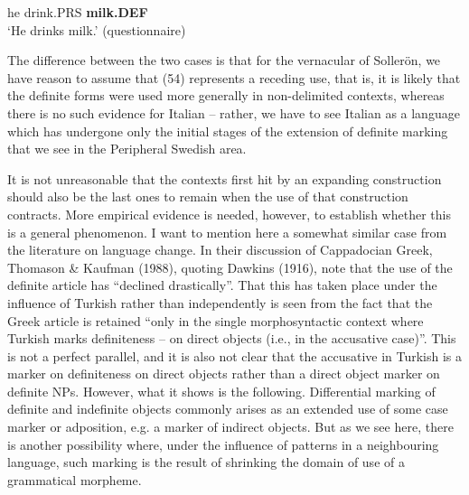 he  drink.PRS  \textbf{milk.DEF}\\


‘He drinks milk.’ (questionnaire)
\z


The difference between the two cases is that for the vernacular of Sollerön, we have reason to assume that (54) represents a receding use, that is, it is likely that the definite forms were used more generally in non-delimited contexts, whereas there is no such evidence for Italian – rather, we have to see Italian as a language which has undergone only the initial stages of the extension of definite marking that we see in the Peripheral Swedish area. 

It is not unreasonable that the contexts first hit by an expanding construction should also be the last ones to remain when the use of that construction contracts. More empirical evidence is needed, however, to establish whether this is a general phenomenon. I want to mention here a somewhat similar case from the literature on language change. In their discussion of Cappadocian Greek, Thomason \& Kaufman (1988), quoting Dawkins (1916), note that the use of the definite article has “declined drastically”. That this has taken place under the influence of Turkish rather than independently is seen from the fact that the Greek article is retained “only in the single morphosyntactic context where Turkish marks definiteness – on direct objects (i.e., in the accusative case)”. This is not a perfect parallel, and it is also not clear that the accusative in Turkish is a marker on definiteness on direct objects rather than a direct object marker on definite NPs. However, what it shows is the following. Differential marking of definite and indefinite objects commonly arises as an extended use of some case marker or adposition, e.g. a marker of indirect objects. But as we see here, there is another possibility where, under the influence of patterns in a neighbouring language, such marking is the result of shrinking the domain of use of a grammatical morpheme. 

